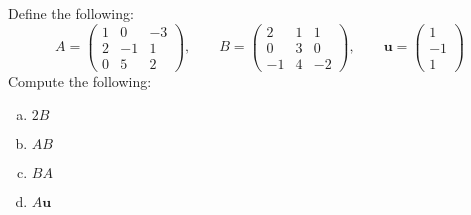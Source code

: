 \documentclass[11pt,letterpaper]{article}
\begin{document}
 Define the following:
	\[
	A= \begin{pmatrix} 1 & 0 & -3 \\ 2 & -1 & 1 \\ 0 & 5 & 2 \end{pmatrix}, \qquad
	B= \begin{pmatrix} 2 & 1 & 1 \\ 0 & 3 & 0 \\ -1 & 4 & -2 \end{pmatrix}, \qquad
	\mathbf{u}= \begin{pmatrix} 1 \\ -1 \\ 1 \end{pmatrix}
	\]
Compute the following:
	\begin{enumerate}[(a)]
	\item $2B$
	\item $AB$
	\item $BA$
	\item $A \mathbf{u}$
	\end{enumerate}
\end{document}

